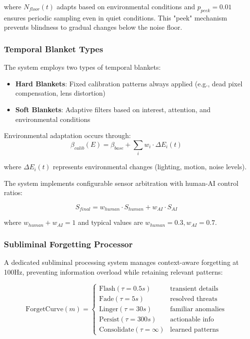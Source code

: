 \documentclass[11pt,letterpaper]{article}
\begin{document}
where $N_{floor}(t)$ adapts based on environmental conditions and $p_{peek} = 0.01$ ensures periodic sampling even in quiet conditions. This "peek" mechanism prevents blindness to gradual changes below the noise floor.

\subsubsection{Temporal Blanket Types}

The system employs two types of temporal blankets:
\begin{itemize}
\item \textbf{Hard Blankets}: Fixed calibration patterns always applied (e.g., dead pixel compensation, lens distortion)
\item \textbf{Soft Blankets}: Adaptive filters based on interest, attention, and environmental conditions
\end{itemize}

Environmental adaptation occurs through:
\begin{equation}
\beta_{calib}(E) = \beta_{base} + \sum_{i} w_i \cdot \Delta E_i(t)
\end{equation}

where $\Delta E_i(t)$ represents environmental changes (lighting, motion, noise levels).

The system implements configurable sensor arbitration with human-AI control ratios:

\begin{equation}
S_{final} = w_{human} \cdot S_{human} + w_{AI} \cdot S_{AI}
\end{equation}

where $w_{human} + w_{AI} = 1$ and typical values are $w_{human} = 0.3, w_{AI} = 0.7$.

\subsubsection{Subliminal Forgetting Processor}

A dedicated subliminal processing system manages context-aware forgetting at 100Hz, preventing information overload while retaining relevant patterns:

\begin{equation}
\text{ForgetCurve}(m) = \begin{cases}
\text{Flash}(\tau = 0.5s) & \text{transient details} \\
\text{Fade}(\tau = 5s) & \text{resolved threats} \\
\text{Linger}(\tau = 30s) & \text{familiar anomalies} \\
\text{Persist}(\tau = 300s) & \text{actionable info} \\
\text{Consolidate}(\tau = \infty) & \text{learned patterns}
\end{cases}
\end{equation}
\end{document}
